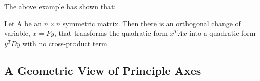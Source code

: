 The above example has shown that:
\begin{theorem}
    Let A be an \(n \times n\) symmetric matrix. Then there is an orthogonal change of variable, \(x = Py\), that transforms the quadratic form \(x^TAx\) into a quadratic form \(y^TDy\) with no cross-product term.    
\end{theorem}

\subsection{A Geometric View of Principle Axes}




